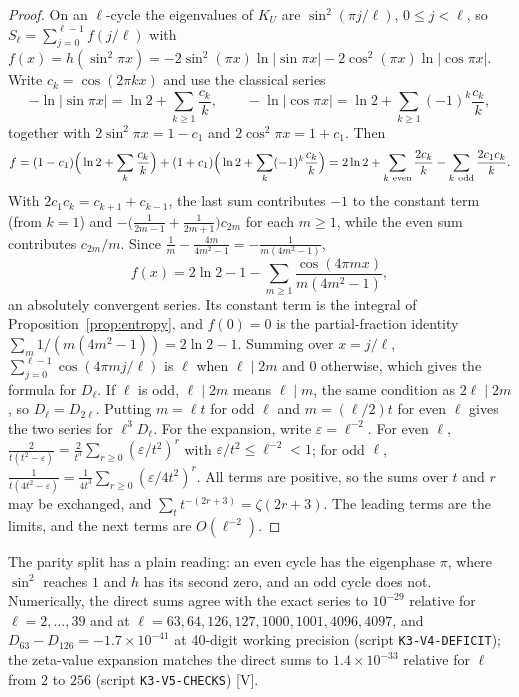 \documentclass[11pt]{article}
\theoremstyle{remark}\newtheorem{remark}[theorem]{Remark}
\begin{document}
\begin{proof}
On an $\ell$-cycle the eigenvalues of $K_U$ are $\sin^2(\pi j/\ell)$, $0\le j<\ell$, so $S_\ell=\sum_{j=0}^{\ell-1}f(j/\ell)$ with $f(x)=h(\sin^2\pi x)=-2\sin^2(\pi x)\ln|\sin\pi x|-2\cos^2(\pi x)\ln|\cos\pi x|$. Write $c_k=\cos(2\pi kx)$ and use the classical series
\[
-\ln|\sin\pi x|=\ln2+\sum_{k\ge1}\frac{c_k}{k},\qquad -\ln|\cos\pi x|=\ln2+\sum_{k\ge1}(-1)^k\frac{c_k}{k},
\]
together with $2\sin^2\pi x=1-c_1$ and $2\cos^2\pi x=1+c_1$. Then
\[
f=(1-c_1)\Big(\ln2+\sum_k\frac{c_k}{k}\Big)+(1+c_1)\Big(\ln2+\sum_k(-1)^k\frac{c_k}{k}\Big)
=2\ln2+\sum_{k\ \rm even}\frac{2c_k}{k}-\sum_{k\ \rm odd}\frac{2c_1c_k}{k}.
\]
With $2c_1c_k=c_{k+1}+c_{k-1}$, the last sum contributes $-1$ to the constant term (from $k=1$) and $-\big(\tfrac1{2m-1}+\tfrac1{2m+1}\big)c_{2m}$ for each $m\ge1$, while the even sum contributes $c_{2m}/m$. Since $\tfrac1m-\tfrac{4m}{4m^2-1}=-\tfrac1{m(4m^2-1)}$,
\[
f(x)=2\ln2-1-\sum_{m\ge1}\frac{\cos(4\pi mx)}{m(4m^2-1)},
\]
an absolutely convergent series. Its constant term is the integral of Proposition~\ref{prop:entropy}, and $f(0)=0$ is the partial-fraction identity $\sum_m 1/(m(4m^2-1))=2\ln2-1$. Summing over $x=j/\ell$, $\sum_{j=0}^{\ell-1}\cos(4\pi mj/\ell)$ is $\ell$ when $\ell\mid2m$ and $0$ otherwise, which gives the formula for $D_\ell$. If $\ell$ is odd, $\ell\mid2m$ means $\ell\mid m$, the same condition as $2\ell\mid2m$, so $D_\ell=D_{2\ell}$. Putting $m=\ell t$ for odd $\ell$ and $m=(\ell/2)t$ for even $\ell$ gives the two series for $\ell^3D_\ell$. For the expansion, write $\varepsilon=\ell^{-2}$. For even $\ell$, $\frac{2}{t(t^2-\varepsilon)}=\frac{2}{t^3}\sum_{r\ge0}(\varepsilon/t^2)^r$ with $\varepsilon/t^2\le\ell^{-2}<1$; for odd $\ell$, $\frac1{t(4t^2-\varepsilon)}=\frac1{4t^3}\sum_{r\ge0}(\varepsilon/4t^2)^r$. All terms are positive, so the sums over $t$ and $r$ may be exchanged, and $\sum_t t^{-(2r+3)}=\zeta(2r+3)$. The leading terms are the limits, and the next terms are $O(\ell^{-2})$.
\end{proof}
The parity split has a plain reading: an even cycle has the eigenphase $\pi$, where $\sin^2$ reaches $1$ and $h$ has its second zero, and an odd cycle does not. Numerically, the direct sums agree with the exact series to $10^{-29}$ relative for $\ell=2,\dots,39$ and at $\ell=63,64,126,127,1000,1001,4096,4097$, and $D_{63}-D_{126}=-1.7\times10^{-41}$ at 40-digit working precision (script \texttt{K3-V4-DEFICIT}); the zeta-value expansion matches the direct sums to $1.4\times10^{-33}$ relative for $\ell$ from $2$ to $256$ (script \texttt{K3-V5-CHECKS}) [V].
\end{document}
